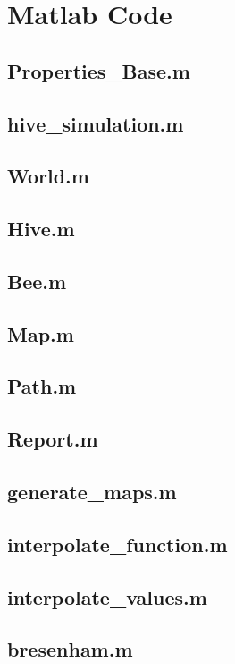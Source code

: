 \section{Matlab Code}
\subsection{Properties\_Base.m}

\subsection{hive\_simulation.m}

\subsection{World.m}

\subsection{Hive.m}

\subsection{Bee.m}

\subsection{Map.m}

\subsection{Path.m}

\subsection{Report.m}

\subsection{generate\_maps.m}

\subsection{interpolate\_function.m}

\subsection{interpolate\_values.m}

\subsection{bresenham.m}

